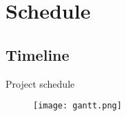 

\section{Schedule}

\subsection{Timeline}

\begin{frame}{Project schedule}
  \begin{figure}[h]
        \centering
        \texttt{[image: gantt.png]}
      \end{figure}
\end{frame}